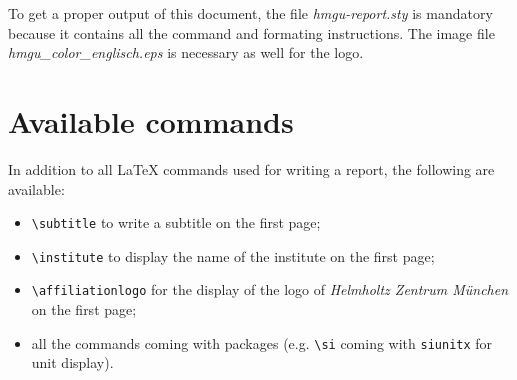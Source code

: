 \documentclass[a4paper,12pt,oneside]{report}
\begin{document}
			To get a proper output of this document, the file \textit{hmgu-report.sty} is mandatory because it contains all the command and formating instructions. The image file \textit{hmgu\_color\_englisch.eps} is necessary as well for the logo.
	
	\section{Available commands}
		In addition to all \LaTeX{} commands used for writing a report, the following are available:
		\begin{itemize}
			\item \verb|\subtitle| to write a subtitle on the first page;
			\item \verb|\institute| to display the name of the institute on the first page;
			\item \verb|\affiliationlogo| for the display of the logo of \emph{Helmholtz Zentrum München} on the first page;
			\item all the commands coming with packages (e.g. \verb|\si| coming with \texttt{siunitx} for unit display).
		\end{itemize}
\end{document}
